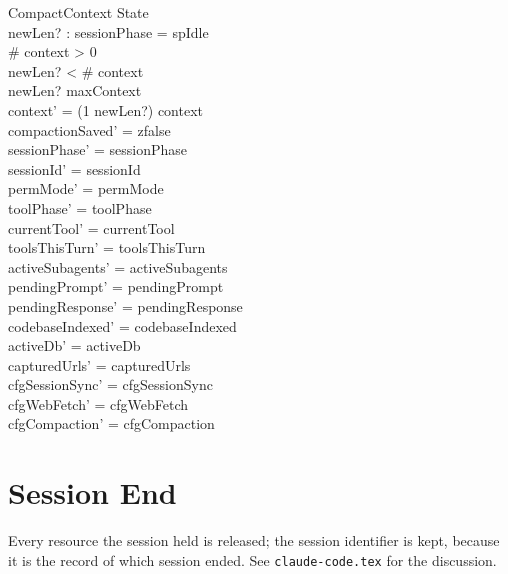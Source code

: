 \documentclass[a4paper,10pt,fleqn]{article}
\begin{document}
\begin{schema}{CompactContext}
  \Delta State \\
  newLen? : \nat
  \where
  sessionPhase = spIdle \\
  \# context > 0 \\
  newLen? < \# context \\
  newLen? \leq maxContext \\
  context' = (1 \upto newLen?) \dres context \\
  compactionSaved' = zfalse \\
  sessionPhase' = sessionPhase \\
  sessionId' = sessionId \\
  permMode' = permMode \\
  toolPhase' = toolPhase \\
  currentTool' = currentTool \\
  toolsThisTurn' = toolsThisTurn \\
  activeSubagents' = activeSubagents \\
  pendingPrompt' = pendingPrompt \\
  pendingResponse' = pendingResponse \\
  codebaseIndexed' = codebaseIndexed \\
  activeDb' = activeDb \\
  capturedUrls' = capturedUrls \\
  cfgSessionSync' = cfgSessionSync \\
  cfgWebFetch' = cfgWebFetch \\
  cfgCompaction' = cfgCompaction
\end{schema}

\section{Session End}

Every resource the session held is released; the session identifier is
kept, because it is the record of which session ended. See
\texttt{claude-code.tex} for the discussion.
\end{document}

